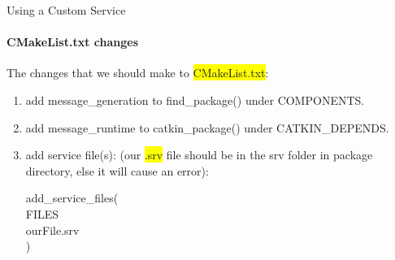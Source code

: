 \documentclass{beamer}
\begin{document}
\begin{frame}{Using a Custom Service}
    \framesubtitle{CMakeList.txt changes}
    
    The changes that we should make to {\ttfamily \colorbox{yellow}{CMakeList.txt}}:
    \vspace{5mm}
    \scriptsize
    \begin{enumerate}
        \item add {\ttfamily \colorbox{gray!30!white}{message\_generation}} to {\ttfamily \colorbox{gray!30!white}{find\_package()}} under {\ttfamily \colorbox{gray!30!white}{COMPONENTS}}.
        \vspace{2mm}
        
        \item  add {\ttfamily \colorbox{gray!30!white}{message\_runtime}} to {\ttfamily \colorbox{gray!30!white}{catkin\_package()}} under {\ttfamily \colorbox{gray!30!white}{CATKIN\_DEPENDS}}.
        \vspace{2mm}
        
        \item add service file(s): (our {\ttfamily \colorbox{yellow}{.srv}} file should be in the {\ttfamily \colorbox{gray!30!white}{srv}} folder in package directory, else it will cause an error):
        \vspace{2mm}
        \begin{focus}
            \ttfamily \scriptsize
            add\_service\_files(\\
            FILES\\
            ourFile.srv\\
            )
          \end{focus}  
   \end{enumerate}
        
\end{frame}
\end{document}
